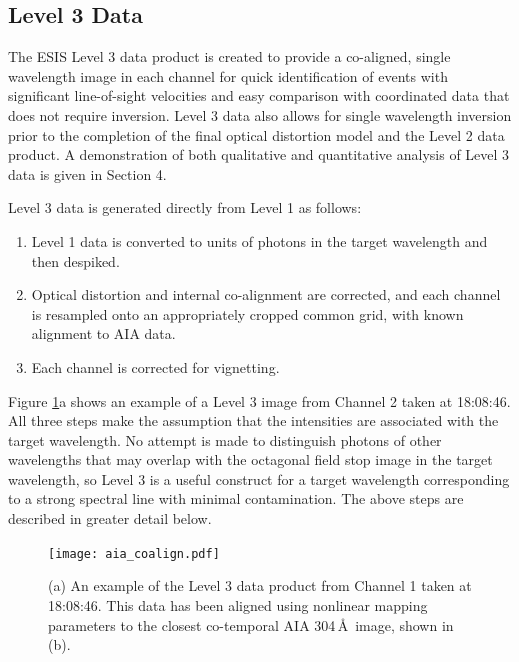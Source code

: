 \subsection{Level 3 Data} \label{sec:level 3}
 
    
\newcommand{\vigfit}{[.35, 0.28, 0.34, 0.6]}
\newcommand{\levthreetime}{18:08:46}

The ESIS Level 3 data product is created to provide a co-aligned, single wavelength image in each channel for quick identification of events with significant line-of-sight velocities and easy comparison with coordinated data that does not require inversion. 
Level 3 data also allows for single wavelength inversion prior to the completion of the final optical distortion model and the Level 2 data product.  A demonstration of both qualitative and quantitative analysis of Level 3 data is given in Section 4.  

Level 3 data is generated directly from Level 1 as follows:
\begin{enumerate}
    \item Level 1 data is converted to units of photons in the target wavelength and then despiked.\label{step:photons}
    \item Optical distortion and internal co-alignment are corrected, and each channel is resampled onto an appropriately cropped common grid, with known alignment to AIA data.\label{step:distortion}
    \item Each channel is corrected for vignetting.\label{step:vignetting}
\end{enumerate}
Figure \ref{fig:coalign}a shows an example of a Level 3 image from Channel 2 taken at \levthreetime. All three steps make the assumption that the intensities are associated with the target wavelength. No attempt is made to distinguish photons of other wavelengths that may overlap with the octagonal field stop image in the target wavelength, so Level 3 is a useful construct for a target wavelength corresponding to a strong spectral line with minimal contamination. The above steps are described in greater detail below.


  \begin{figure}[htb!]
	\centering
	\texttt{[image: aia\_coalign.pdf]}
	\caption{(a) An example of the Level 3 data product from Channel 1 taken at \levthreetime. This data has been aligned using nonlinear mapping parameters to the closest co-temporal AIA 304\,\AA\ image, shown in (b). }
	\label{fig:coalign}
\end{figure}
    	
